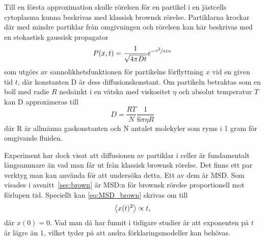 Till en första approximation skulle rörelsen för en partikel i en jästcells cytoplasma kunna beskrivas med klassisk brownsk rörelse. Partiklarna krockar där med mindre partiklar från omgivningen och rörelsen kan här beskrivas med en stokastisk gaussisk propagator~\cite{Einstein1905}
\begin{equation}
P(x,t)=\frac{1}{\sqrt{4\pi Dt}}e^{-\nicefrac{x^2}{4Dt}}
\end{equation} %
som utgörs av sannolikhetsfunktionen för partikelns förflyttning $x$ vid en given tid $t$, där konstanten D är dess diffusionskonstant. Om partikeln betraktas som en boll med radie $R$ nedsänkt i en vätska med viskositet $\eta$ och absolut temperatur $T$ kan D approximeras till~\cite{Einstein1905}
\begin{equation}
D=\frac{RT}{N}\frac{1}{6\pi \eta R}
\end{equation}
där R är allmänna gaskonstanten och N antalet molekyler som ryms i 1 gram för omgivande fluiden.

Experiment\cite{Midtveldt_etal2016} har dock visat att diffusionen av partiklar i celler är fundamentalt långsammare än vad man får ut från klassisk brownsk rörelse. Det finns ett par verktyg man kan använda för att undersöka detta. Ett av dem är MSD. Som visades i avsnitt~\ref{sec:brown} är MSD:n för brownsk rörelse proportionell mot förlupen tid. Speciellt kan \eqref{eq:MSD_brown} skrivas om till
\begin{equation}
\ev{x(t)^2} \propto t,
\end{equation}
där $x(0)=0$. Vad man\cite{Midtveldt_etal2016} då har funnit i tidigare studier är att exponenten på $t$ är lägre än $1$, vilket tyder på att andra förklaringsmodeller kan behövas. %



